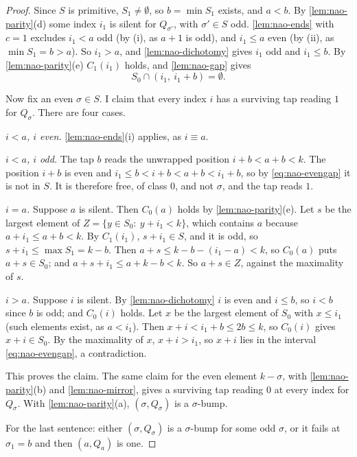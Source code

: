 \begin{proof}
Since $S$ is primitive, $S_1\neq\emptyset$, so $b=\min S_1$ exists, and
$a<b$. By \autoref{lem:nao-parity}(d) some index $i_1$ is silent for
$Q_{\sigma'}$, with $\sigma'\in S$ odd. \autoref{lem:nao-ends} with $c=1$
excludes $i_1<a$ odd (by (i), as $a+1$ is odd), and $i_1\le a$ even (by
(ii), as $\min S_1=b>a$). So $i_1>a$, and \autoref{lem:nao-dichotomy} gives
$i_1$ odd and $i_1\le b$. By \autoref{lem:nao-parity}(e) $C_1(i_1)$ holds,
and \autoref{lem:nao-gap} gives
\begin{equation}
S_0\cap(i_1,\ i_1+b)=\emptyset .
\label{eq:nao-evengap}
\end{equation}

Now fix an even $\sigma\in S$. I claim that every index $i$ has a surviving
tap reading $1$ for $Q_\sigma$. There are four cases.

\emph{$i<a$, $i$ even.} \autoref{lem:nao-ends}(i) applies, as $i\equiv a$.

\emph{$i<a$, $i$ odd.} The tap $b$ reads the unwrapped position $i+b<a+b<k$. The
position $i+b$ is even and $i_1\le b<i+b<a+b<i_1+b$, so by
\eqref{eq:nao-evengap} it is not in $S$. It is therefore free, of class
$0$, and not $\sigma$, and the tap reads $1$.

\emph{$i=a$.} Suppose $a$ is silent. Then $C_0(a)$ holds by
\autoref{lem:nao-parity}(e). Let $s$ be the largest element of
$Z=\{y\in S_0:\ y+i_1<k\}$, which contains $a$ because $a+i_1\le a+b<k$. By
$C_1(i_1)$, $s+i_1\in S$, and it is odd, so $s+i_1\le\max S_1=k-b$. Then
$a+s\le k-b-(i_1-a)<k$, so $C_0(a)$ puts $a+s\in S_0$; and
$a+s+i_1\le a+k-b<k$. So $a+s\in Z$, against the maximality of $s$.

\emph{$i>a$.} Suppose $i$ is silent. By \autoref{lem:nao-dichotomy} $i$ is
even and $i\le b$, so $i<b$ since $b$ is odd; and $C_0(i)$ holds. Let $x$ be
the largest element of $S_0$ with $x\le i_1$ (such elements exist, as
$a<i_1$). Then $x+i<i_1+b\le 2b\le k$, so $C_0(i)$ gives $x+i\in S_0$. By the
maximality of $x$, $x+i>i_1$, so $x+i$ lies in the interval
\eqref{eq:nao-evengap}, a contradiction.

This proves the claim. The same claim for the even element $k-\sigma$, with
\autoref{lem:nao-parity}(b) and \autoref{lem:nao-mirror}, gives a surviving
tap reading $0$ at every index for $Q_\sigma$. With
\autoref{lem:nao-parity}(a), $(\sigma,Q_\sigma)$ is a $\sigma$-bump.

For the last sentence: either $(\sigma,Q_\sigma)$ is a $\sigma$-bump for
some odd $\sigma$, or it fails at $\sigma_1=b$ and then $(a,Q_a)$ is one.
\end{proof}

